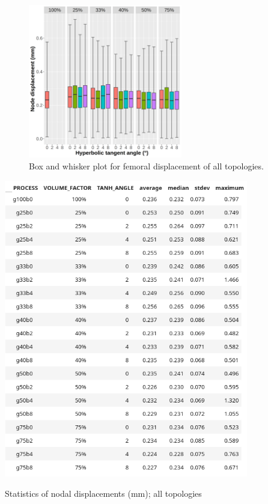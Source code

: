 \documentclass[../main.tex]{subfiles}
\begin{document}
\begin{figure}[h!]
  \centering
  \includegraphics[width=0.6\textwidth]{images/results/plots/femoral/displacement/boxplots.png}
  \caption{Box and whisker plot for femoral displacement of all topologies.}
  \label{fig:disp_boxwhisker}
\end{figure}

\begin{table}[h!]
  \centering 
  \includegraphics[width=0.8\textwidth]{images/results/plots/femoral/displacement/statistics.png}
  \caption{Statistics of nodal displacements (mm); all topologies}
  \label{table:disp_stats}
\end{table}
\end{document}
